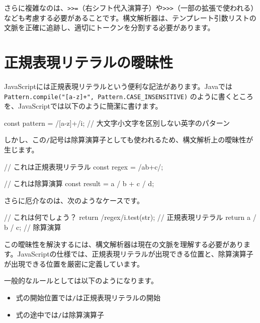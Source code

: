 さらに複雑なのは、\texttt{\textgreater{}\textgreater{}=}（右シフト代入演算子）や\texttt{\textgreater{}\textgreater{}\textgreater{}}（一部の拡張で使われる）なども考慮する必要があることです。構文解析器は、テンプレート引数リストの文脈を正確に追跡し、適切にトークンを分割する必要があります。

\section{正規表現リテラルの曖昧性}

JavaScriptには正規表現リテラルという便利な記法があります。Javaでは
\texttt{Pattern.compile("{[}a-z{]}+",\ Pattern.CASE\_INSENSITIVE)}
のように書くところを、JavaScriptでは以下のように簡潔に書けます。

\begin{codescreen}{}
const pattern = /[a-z]+/i;  // 大文字小文字を区別しない英字のパターン
\end{codescreen}

しかし、この\texttt{/}記号は除算演算子としても使われるため、構文解析上の曖昧性が生じます。

\begin{codescreen}{}
// これは正規表現リテラル
const regex = /ab+c/;

// これは除算演算
const result = a / b + c / d;
\end{codescreen}

さらに厄介なのは、次のようなケースです。

\begin{codescreen}{}
// これは何でしょう？
return /regex/i.test(str);  // 正規表現リテラル
return a / b / c;            // 除算演算
\end{codescreen}

この曖昧性を解決するには、構文解析器は現在の文脈を理解する必要があります。JavaScriptの仕様では、正規表現リテラルが出現できる位置と、除算演算子が出現できる位置を厳密に定義しています。

一般的なルールとしては以下のようになります。

\begin{itemize}
\item
  式の開始位置では\texttt{/}は正規表現リテラルの開始
\item
  式の途中では\texttt{/}は除算演算子
\end{itemize}

